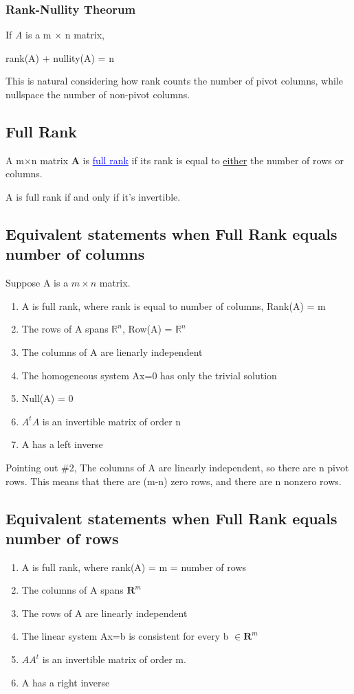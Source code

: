 \documentclass{article}
\newcommand{\bul}[1]{\textcolor{blue}{\underline{#1}}}
\begin{document}
\subsubsection{Rank-Nullity Theorum}
If \textit{A} is a m $\times$ n matrix,
\begin{center}
    rank(A) + nullity(A) = n
\end{center}

This is natural considering how rank counts the number of pivot columns, while nullspace the number of non-pivot columns.

\subsection{Full Rank}
A m$\times$n matrix \textbf{A} is \bul{full rank} if its rank is equal to \underline{either} the number of rows or columns.

A is full rank if and only if it's invertible.

\subsection{Equivalent statements when Full Rank equals number of columns}
\label{sec:eswfrenoc}
Suppose A is a $m \times n$ matrix.
\begin{enumerate}
    \item A is full rank, where rank is equal to number of columns, Rank(A) = m
    \item The rows of A spans $\mathbb{R}^n$, Row(A) = $\mathbb{R}^n$
    \item The columns of A are lienarly independent
    \item The homogeneous system Ax=0 has only the trivial solution
    \item Null(A) = {0}
    \item $A^tA$ is an invertible matrix of order n
    \item A has a left inverse
\end{enumerate}

Pointing out \#2, The columns of A are linearly independent, so there are n pivot rows. This means that there are (m-n) zero rows, and there are n nonzero rows.

\subsection{Equivalent statements when Full Rank equals number of rows}
\label{sec:eswfrenor}
\begin{enumerate}
    \item A is full rank, where rank(A) = m = number of rows
    \item The columns of A spans $\mathbf{R}^m$
    \item The rows of A are linearly independent
    \item The linear system Ax=b is consistent for every b $\in \mathbf{R}^m$
    \item $AA^t$ is an invertible matrix of order m.
    \item A has a right inverse
\end{enumerate}
\end{document}
